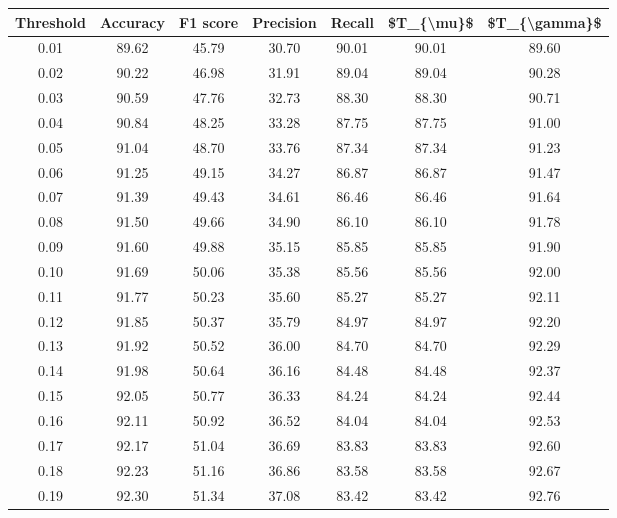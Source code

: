 \begin{tabular}{|c|c|c|c|c|c|c|}
\hline
 Threshold &  Accuracy &  F1 score &  Precision &  Recall &  \$T\_\{\textbackslash mu\}\$ &  \$T\_\{\textbackslash gamma\}\$ \\
\hline
      0.01 &     89.62 &     45.79 &      30.70 &   90.01 &      90.01 &         89.60 \\
      0.02 &     90.22 &     46.98 &      31.91 &   89.04 &      89.04 &         90.28 \\
      0.03 &     90.59 &     47.76 &      32.73 &   88.30 &      88.30 &         90.71 \\
      0.04 &     90.84 &     48.25 &      33.28 &   87.75 &      87.75 &         91.00 \\
      0.05 &     91.04 &     48.70 &      33.76 &   87.34 &      87.34 &         91.23 \\
      0.06 &     91.25 &     49.15 &      34.27 &   86.87 &      86.87 &         91.47 \\
      0.07 &     91.39 &     49.43 &      34.61 &   86.46 &      86.46 &         91.64 \\
      0.08 &     91.50 &     49.66 &      34.90 &   86.10 &      86.10 &         91.78 \\
      0.09 &     91.60 &     49.88 &      35.15 &   85.85 &      85.85 &         91.90 \\
      0.10 &     91.69 &     50.06 &      35.38 &   85.56 &      85.56 &         92.00 \\
      0.11 &     91.77 &     50.23 &      35.60 &   85.27 &      85.27 &         92.11 \\
      0.12 &     91.85 &     50.37 &      35.79 &   84.97 &      84.97 &         92.20 \\
      0.13 &     91.92 &     50.52 &      36.00 &   84.70 &      84.70 &         92.29 \\
      0.14 &     91.98 &     50.64 &      36.16 &   84.48 &      84.48 &         92.37 \\
      0.15 &     92.05 &     50.77 &      36.33 &   84.24 &      84.24 &         92.44 \\
      0.16 &     92.11 &     50.92 &      36.52 &   84.04 &      84.04 &         92.53 \\
      0.17 &     92.17 &     51.04 &      36.69 &   83.83 &      83.83 &         92.60 \\
      0.18 &     92.23 &     51.16 &      36.86 &   83.58 &      83.58 &         92.67 \\
      0.19 &     92.30 &     51.34 &      37.08 &   83.42 &      83.42 &         92.76 \\

\end{tabular}
